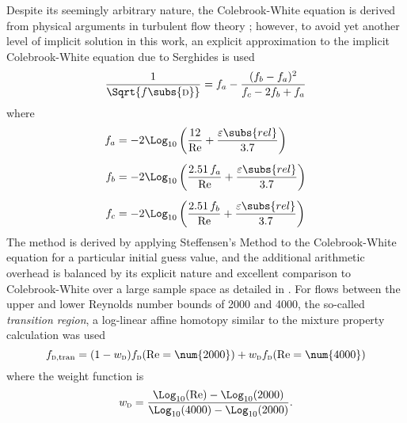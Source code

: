 Despite its seemingly arbitrary nature, the Colebrook-White equation is derived from physical arguments in turbulent flow theory \cite{matthew_colebrook-white_1990}; however, to avoid yet another level of implicit solution in this work, an explicit approximation to the implicit Colebrook-White equation due to Serghides is used
\begin{equation}
    \frac{1}{\Sqrt{f\subs{\textsc{d}}}} = f_a - \frac{(f_b - f_a)^2}{f_c - 2 f_b + f_a}
\end{equation}
where
\begin{subequations}
    \begin{align}
        f_a &= -2 \Log_{10}\left( \frac{12}       {\text{Re}} + \frac{\varepsilon\subs{rel}}{3.7}\right) \\[0.5em]
        f_b &= -2 \Log_{10}\left( \frac{2.51\,f_a}{\text{Re}} + \frac{\varepsilon\subs{rel}}{3.7}\right)\\[0.5em]
        f_c &= -2 \Log_{10}\left( \frac{2.51\,f_b}{\text{Re}} + \frac{\varepsilon\subs{rel}}{3.7}\right)
    \end{align}
\end{subequations}
The method is derived by applying Steffensen's Method to the Colebrook-White equation for a particular initial guess value, and the additional arithmetic overhead is balanced by its explicit nature and excellent comparison to Colebrook-White over a large sample space as detailed in \cite{burden_numerical_2004,winning_explicit_2012}.
For flows between the upper and lower Reynolds number bounds of \num{2000} and \num{4000}, the so-called \textit{transition region}, a log-linear affine homotopy similar to the mixture property calculation was used
\begin{equation}
    f_{\text{\textsc{d},tran}} =    (1-w_{\text{\textsc{d}}}) f_{\text{\textsc{d}}}(\text{Re} = \num{2000}) + 
                                       w_{\text{\textsc{d}}}  f_{\text{\textsc{d}}}(\text{Re} = \num{4000})
\end{equation}
where the weight function is 
\begin{equation}
    w_{\text{\textsc{d}}} = \frac{\Log_{10}(\text{Re}) - \Log_{10}(\text{2000})}{\Log_{10}(\text{4000}) - \Log_{10}(\text{2000})}.
\end{equation}

